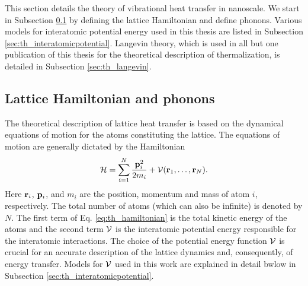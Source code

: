 This section details the theory of vibrational heat transfer in nanoscale. We start in Subsection \ref{sec:th_phonons} by defining the lattice Hamiltonian and define phonons. Various models for interatomic potential energy used in this thesis are listed in Subsection \ref{sec:th_interatomicpotential}. Langevin theory, which is used in all but one publication of this thesis for the theoretical description of thermalization, is detailed in Subsection \ref{sec:th_langevin}.

\subsection{Lattice Hamiltonian and phonons}
\label{sec:th_phonons}

The theoretical description of lattice heat transfer is based on the dynamical equations of motion for the atoms constituting the lattice. The equations of motion are generally dictated by the Hamiltonian \cite{ziman}
\begin{equation}
 \mathcal{H} = \sum_{i=1}^N \frac{\mathbf{p}_i^2}{2m_i} + \mathcal{V}(\mathbf{r}_1,\dots,\mathbf{r}_N). \label{eq:th_hamiltonian}
\end{equation}
Here $\mathbf{r}_i$, $\mathbf{p}_i$, and $m_i$ are the position, momentum and mass of atom $i$, respectively. The total number of atoms (which can also be infinite) is denoted by $N$. The first term of Eq. \eqref{eq:th_hamiltonian} is the total kinetic energy of the atoms and the second term $\mathcal{V}$ is the interatomic potential energy responsible for the interatomic interactions. The choice of the potential energy function $\mathcal{V}$ is crucial for an accurate description of the lattice dynamics and, consequently, of energy transfer. Models for $\mathcal{V}$ used in this work are explained in detail bwlow in Subsection \ref{sec:th_interatomicpotential}.

